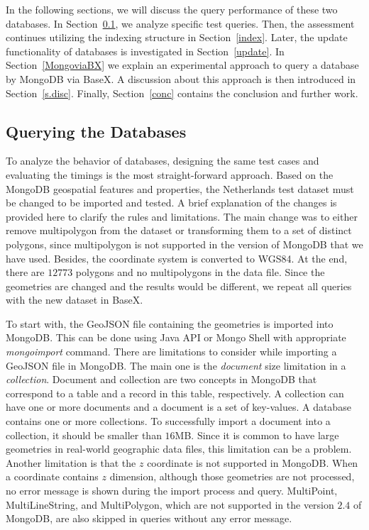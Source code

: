 \documentclass[a4paper,12pt]{article}
\begin{document}
In the following sections, we will discuss the query performance of these two databases. 
In Section~\ref{s.query}, we analyze specific test queries. Then, the assessment continues
utilizing the indexing structure in Section~\ref{index}. Later, the update functionality of databases is 
investigated in Section~\ref{update}. In Section~\ref{MongoviaBX} we explain an experimental approach to query a database by MongoDB via BaseX. A discussion about this approach is then introduced in Section~\ref{s.disc}. Finally, Section~\ref{conc} contains the conclusion and further work.

\subsection{Querying the Databases}
\label{s.query}
To analyze the behavior of databases, designing the same test cases and evaluating the timings is the most straight-forward approach. Based on the MongoDB geospatial features and properties, the Netherlands test dataset must be changed to be imported and tested. A brief explanation of the changes is provided here to clarify the rules and limitations. The main change was to either remove multipolygon from the dataset or transforming them to a set of distinct polygons, since multipolygon is not supported in the version of MongoDB that we have used. Besides, the coordinate system is converted to WGS84. At the end, there are $12773$ polygons and no multipolygons in the data file. Since the geometries are changed and the results would be different, we repeat all queries with the new dataset in BaseX.

To start with, the GeoJSON file containing the geometries is imported into MongoDB. This can be done  using Java API or Mongo Shell with appropriate \textit{mongoimport} command. There are limitations to consider while importing a GeoJSON file in MongoDB. The main one is the \textit{document} size limitation in a \textit{collection}. Document and collection are two concepts in MongoDB that correspond to a table and a record in this table, respectively. A collection can have one or more documents and a document is a set of key-values. A database contains one or more collections. To successfully import a document into a collection, it should be smaller than $16$MB. Since it is common to have large geometries in real-world geographic data files, this limitation can be a problem. Another limitation is that the $z$ coordinate is not supported in MongoDB. When a coordinate contains $z$ dimension, although those geometries are not processed, no error message is shown during the import process and query. Multi\-Point, Multi\-Line\-String, and Multi\-Polygon, which are not supported in the version $2.4$ of MongoDB, are also skipped in queries without any error message. 
\end{document}
